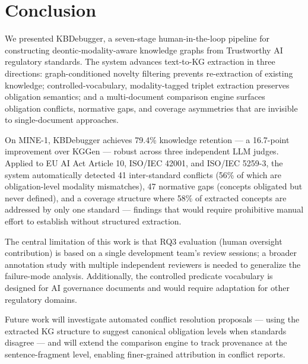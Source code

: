 \section{Conclusion}

We presented KBDebugger, a seven-stage human-in-the-loop pipeline for constructing deontic-modality-aware knowledge graphs from Trustworthy AI regulatory standards. The system advances text-to-KG extraction in three directions: graph-conditioned novelty filtering prevents re-extraction of existing knowledge; controlled-vocabulary, modality-tagged triplet extraction preserves obligation semantics; and a multi-document comparison engine surfaces obligation conflicts, normative gaps, and coverage asymmetries that are invisible to single-document approaches.

On MINE-1, KBDebugger achieves 79.4\% knowledge retention — a 16.7-point improvement over KGGen — robust across three independent LLM judges. Applied to EU AI Act Article 10, ISO/IEC 42001, and ISO/IEC 5259-3, the system automatically detected 41 inter-standard conflicts (56\% of which are obligation-level modality mismatches), 47 normative gaps (concepts obligated but never defined), and a coverage structure where 58\% of extracted concepts are addressed by only one standard — findings that would require prohibitive manual effort to establish without structured extraction.

The central limitation of this work is that RQ3 evaluation (human oversight contribution) is based on a single development team's review sessions; a broader annotation study with multiple independent reviewers is needed to generalize the failure-mode analysis. Additionally, the controlled predicate vocabulary is designed for AI governance documents and would require adaptation for other regulatory domains.

Future work will investigate automated conflict resolution proposals — using the extracted KG structure to suggest canonical obligation levels when standards disagree — and will extend the comparison engine to track provenance at the sentence-fragment level, enabling finer-grained attribution in conflict reports.
